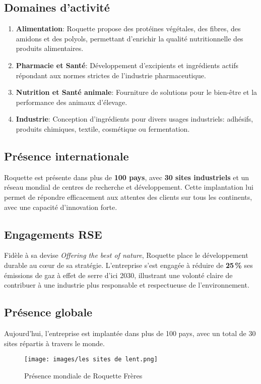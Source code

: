 \documentclass[12pt,a4paper]{report}
\begin{document}
\subsection*{Domaines d’activité}
\begin{enumerate}
  \item \textbf{Alimentation}: Roquette propose des protéines végétales, des fibres, des amidons et des polyols,
  permettant d’enrichir la qualité nutritionnelle des produits alimentaires.
  \item \textbf{Pharmacie et Santé}: Développement d’excipients et ingrédients actifs répondant aux normes
  strictes de l’industrie pharmaceutique.
  \item \textbf{Nutrition et Santé animale}: Fourniture de solutions pour le bien-être et la performance
  des animaux d’élevage.
  \item \textbf{Industrie}: Conception d’ingrédients pour divers usages industriels: adhésifs,
  produits chimiques, textile, cosmétique ou fermentation.
\end{enumerate}

\subsection*{Présence internationale}
Roquette est présente dans plus de \textbf{100 pays}, avec \textbf{30 sites industriels} et un réseau mondial
de centres de recherche et développement.
Cette implantation lui permet de répondre efficacement aux attentes des clients sur tous les continents,
avec une capacité d’innovation forte.

\subsection*{Engagements RSE}
Fidèle à sa devise \og\textit{Offering the best of nature}\fg{},
Roquette place le développement durable au cœur de sa stratégie.
L’entreprise s’est engagée à réduire de \textbf{25\,\%} ses émissions de gaz à effet de serre d’ici 2030,
illustrant une volonté claire de contribuer à une industrie plus responsable et respectueuse de l’environnement.

\subsection*{Présence globale}
Aujourd’hui, l’entreprise est implantée dans plus de 100 pays,
avec un total de 30 sites répartis à travers le monde.

\begin{figure}[H]
    \centering
    \texttt{[image: images/les sites de lent.png]}
    \caption{Présence mondiale de Roquette Frères}
    \label{fig:presence}
\end{figure}
\end{document}

